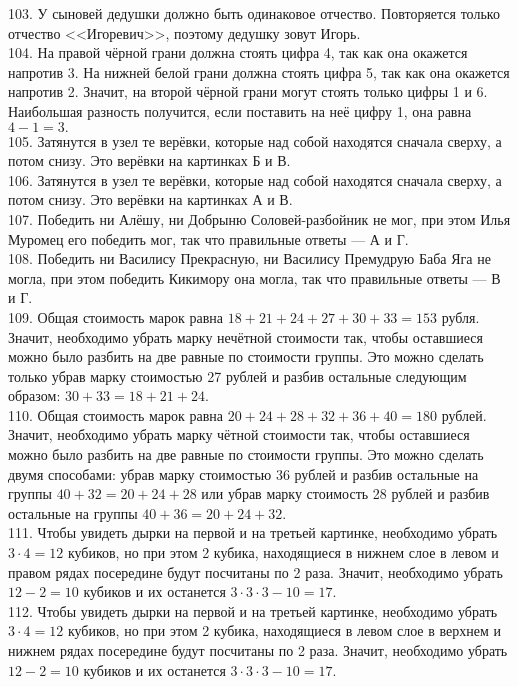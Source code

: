 103. У сыновей дедушки должно быть одинаковое отчество. Повторяется только отчество <<Игоревич>>, поэтому дедушку зовут Игорь.\\
104. На правой чёрной грани должна стоять цифра 4, так как она окажется напротив 3. На нижней белой грани должна стоять цифра 5, так как она окажется напротив 2. Значит, на второй чёрной грани могут стоять только цифры 1 и 6. Наибольшая разность получится, если поставить на неё цифру 1, она равна $4-1=3.$\\
105. Затянутся в узел те верёвки, которые над собой находятся сначала сверху, а потом снизу. Это верёвки на картинках Б и В.\\
106. Затянутся в узел те верёвки, которые над собой находятся сначала сверху, а потом снизу. Это верёвки на картинках А и В.\\
107. Победить ни Алёшу, ни Добрыню Соловей-разбойник не мог, при этом Илья Муромец его победить мог, так что правильные ответы --- А и Г.\\
108. Победить ни Василису Прекрасную, ни Василису Премудрую Баба Яга не могла, при этом победить Кикимору она могла, так что правильные ответы --- В и Г.\\
109. Общая стоимость марок равна $18+21+24+27+30+33=153$ рубля. Значит, необходимо убрать марку нечётной стоимости так, чтобы оставшиеся можно было разбить на две равные по стоимости группы. Это можно сделать только убрав марку стоимостью 27 рублей и разбив остальные следующим образом: $30+33=18+21+24.$\\
110. Общая стоимость марок равна $20+24+28+32+36+40=180$ рублей. Значит, необходимо убрать марку чётной стоимости так, чтобы оставшиеся можно было разбить на две равные по стоимости группы. Это можно сделать двумя способами: убрав марку стоимостью 36 рублей и разбив остальные на группы $40+32=20+24+28$ или убрав марку стоимость 28 рублей и разбив остальные на группы $40+36=20+24+32.$\\
111. Чтобы увидеть дырки на первой и на третьей картинке, необходимо убрать $3\cdot4=12$ кубиков, но при этом 2 кубика, находящиеся в нижнем слое в левом и правом рядах посередине будут посчитаны по 2 раза. Значит, необходимо убрать $12-2=10$ кубиков и их останется $3\cdot3\cdot3-10=17.$\\
112. Чтобы увидеть дырки на первой и на третьей картинке, необходимо убрать $3\cdot4=12$ кубиков, но при этом 2 кубика, находящиеся в левом слое в верхнем и нижнем рядах посередине будут посчитаны по 2 раза. Значит, необходимо убрать $12-2=10$ кубиков и их останется $3\cdot3\cdot3-10=17.$\\
